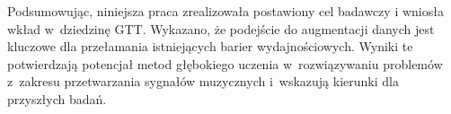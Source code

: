 Podsumowując, niniejsza praca zrealizowała postawiony cel badawczy i wniosła wkład w~dziedzinę GTT. Wykazano, że podejście do augmentacji danych jest kluczowe dla przełamania istniejących barier wydajnościowych. Wyniki te potwierdzają potencjał metod głębokiego uczenia w~rozwiązywaniu problemów z~zakresu przetwarzania sygnałów muzycznych i~wskazują kierunki dla przyszłych badań.